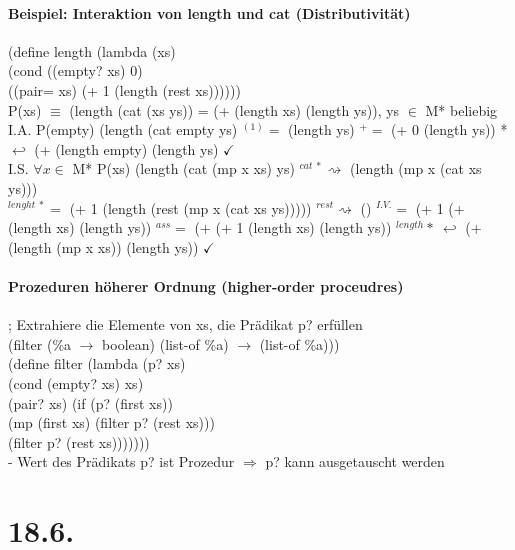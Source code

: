 \documentclass[a4paper, 20pt, openany]{book}
\begin{document}
\subsubsection{Beispiel: Interaktion von length und cat (Distributivität)}
(define length (lambda (xs)\\
(cond ((empty? xs) 0)\\
((pair= xs) (+ 1 (length (rest xs))))))\\
P(xs) $\equiv$ (length (cat (xs ys)) = (+ (length xs) (length ys)), ys $\in$ M* beliebig\\
I.A. P(empty)
(length (cat empty ys) $^{(1)} = $ (length ys) $^{+}=$ (+ 0 (length ys)) *$\hookleftarrow$ (+ (length empty) (length ys) $\checkmark$\\
I.S. $\forall x \in $ M* P(xs) (length (cat (mp x xs) ys) $^{cat \ *} \rightsquigarrow$ (length (mp x (cat xs ys)))\\
$^{lenght\ *} =$ (+ 1 (length (rest (mp x (cat xs ys))))) $^{rest} \rightsquigarrow$ () $^{I.V.} =$ (+ 1 (+ (length xs) (length ys)) $^{ass} =$ (+ (+ 1 (length xs) (length ys)) $^{length} * \ \hookleftarrow$ (+ (length (mp x xs)) (length ys)) $\checkmark$\\

\subsubsection{Prozeduren höherer Ordnung (higher-order proceudres)}
; Extrahiere die Elemente von xs, die Prädikat p? erfüllen\\
(filter (\%a $\rightarrow$ boolean) (list-of \%a) $\rightarrow$ (list-of \%a)))\\
(define filter (lambda (p? xs)\\
(cond (empty? xs) xs)\\
(pair? xs) (if (p? (first xs))\\
(mp (first xs) (filter p? (rest xs)))\\
(filter p? (rest xs)))))))\\

- Wert des Prädikats p? ist Prozedur
$\Rightarrow$ p? kann ausgetauscht werden

\chapter{18.6.}
\end{document}
